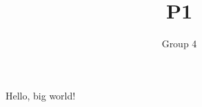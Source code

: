 \documentclass[11pt]{article}
\title{P1}
\author{Group 4}
\begin{document}
    \maketitle

    Hello, big world! \cite{how-to}

    

    
    
\end{document}
